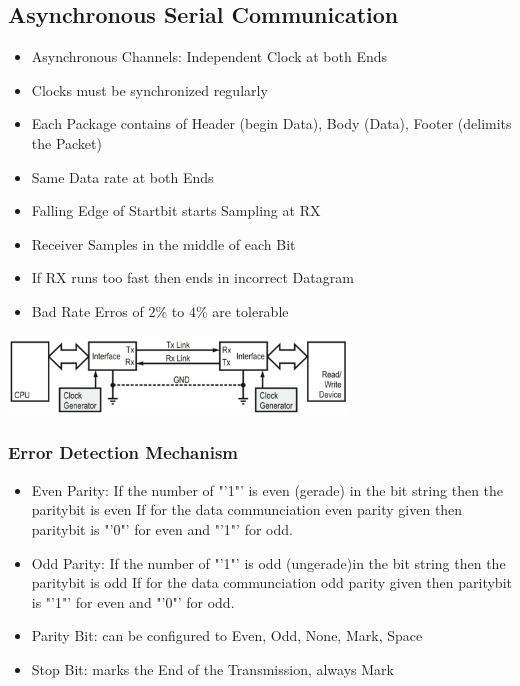 \clearpage
\pagebreak
\subsection{Asynchronous Serial Communication }
\begin{minipage}{12cm}
	\begin{itemize}
		\item Asynchronous Channels: Independent Clock at both Ends	
		\item Clocks must be synchronized regularly
		\item Each Package contains of Header (begin Data), Body (Data), Footer (delimits the Packet)
		\item Same Data rate at both Ends
		\item Falling Edge of Startbit starts Sampling at RX
		\item Receiver Samples in the middle of each Bit
		\item If RX runs too fast then ends in incorrect Datagram
		\item Bad Rate Erros of $2\%$ to $4\%$ are tolerable
	\end{itemize}
\end{minipage}
\begin{minipage}{7cm}
    \vspace{0.6cm}
	\hspace{-2cm}\includegraphics[width=9cm]{images/asyn}
\end{minipage}

\subsubsection{Error Detection Mechanism}
\begin{itemize}
	\item Even Parity: If the number of "'1"' is even (gerade) in the bit string then the paritybit is even \newline If for the data communciation even parity given then paritybit is "'0"' for even and "'1"' for odd. 
	\item Odd Parity: If the number of "'1"' is odd (ungerade)in the bit string then the paritybit is odd \newline If for the data communciation odd parity given then paritybit is "'1"' for even and "'0"' for odd.
	\item Parity Bit: can be configured to Even, Odd, None, Mark, Space
	\item Stop Bit: marks the End of the Transmission, always Mark
\end{itemize}
